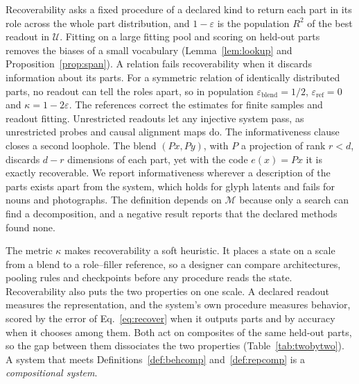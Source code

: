 \documentclass[10pt]{article}
\theoremstyle{plain}
\theoremstyle{remark}
\newcommand{\U}{\mathcal{U}}
\newcommand{\M}{\mathcal{M}}
\begin{document}
Recoverability asks a fixed procedure of a declared kind to return each part in its role across the whole part distribution, and $1 - \varepsilon$ is the population $R^2$ of the best readout in $\U$. Fitting on a large fitting pool and scoring on held-out parts removes the biases of a small vocabulary (Lemma~\ref{lem:lookup} and Proposition~\ref{prop:span}). A relation fails recoverability when it discards information about its parts. For a symmetric relation of identically distributed parts, no readout can tell the roles apart, so in population $\varepsilon_{\mathrm{blend}} = 1/2$, $\varepsilon_{\mathrm{ref}} = 0$ and $\kappa = 1 - 2\varepsilon$. The references correct the estimates for finite samples and readout fitting. Unrestricted readouts let any injective system pass, as unrestricted probes \citep{hewitt2019} and causal alignment maps \citep{sutter2025} do. The informativeness clause closes a second loophole. The blend $(Px, Py)$, with $P$ a projection of rank $r < d$, discards $d - r$ dimensions of each part, yet with the code $e(x) = Px$ it is exactly recoverable. We report informativeness wherever a description of the parts exists apart from the system, which holds for glyph latents and fails for nouns and photographs. The definition depends on $\M$ because only a search can find a decomposition, and a negative result reports that the declared methods found none.

The metric $\kappa$ makes recoverability a soft heuristic. It places a state on a scale from a blend to a role--filler reference, so a designer can compare architectures, pooling rules and checkpoints before any procedure reads the state. Recoverability also puts the two properties on one scale. A declared readout measures the representation, and the system's own procedure measures behavior, scored by the error of Eq.~\ref{eq:recover} when it outputs parts and by accuracy when it chooses among them. Both act on composites of the same held-out parts, so the gap between them dissociates the two properties (Table~\ref{tab:twobytwo}). A system that meets Definitions~\ref{def:behcomp} and~\ref{def:repcomp} is a \emph{compositional system}.
\end{document}
